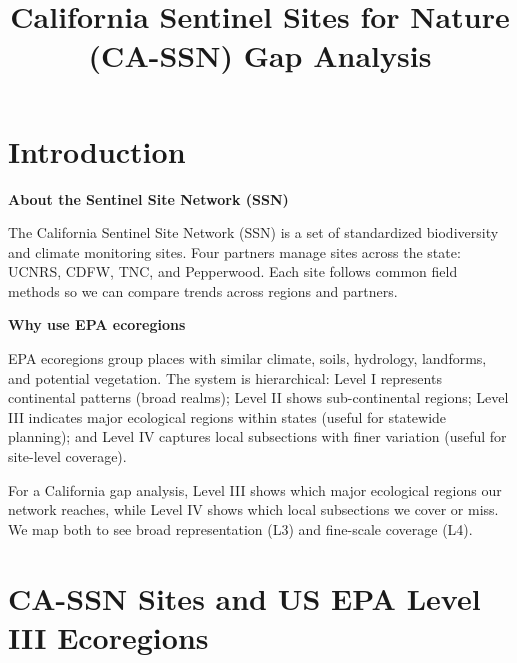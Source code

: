 \documentclass[
  letterpaper,
  DIV=11,
  numbers=noendperiod]{scrartcl}
\title{California Sentinel Sites for Nature (CA-SSN) Gap Analysis}
\author{}
\date{}
\begin{document}
\maketitle


\section{Introduction}\label{introduction}

\textbf{About the Sentinel Site Network (SSN)}

The California Sentinel Site Network (SSN) is a set of standardized
biodiversity and climate monitoring sites. Four partners manage sites
across the state: UCNRS, CDFW, TNC, and Pepperwood. Each site follows
common field methods so we can compare trends across regions and
partners.

\textbf{Why use EPA ecoregions}

EPA ecoregions group places with similar climate, soils, hydrology,
landforms, and potential vegetation. The system is hierarchical: Level I
represents continental patterns (broad realms); Level II shows
sub-continental regions; Level III indicates major ecological regions
within states (useful for statewide planning); and Level IV captures
local subsections with finer variation (useful for site-level coverage).

For a California gap analysis, Level III shows which major ecological
regions our network reaches, while Level IV shows which local
subsections we cover or miss. We map both to see broad representation
(L3) and fine-scale coverage (L4).

\section{CA-SSN Sites and US EPA Level III
Ecoregions}\label{ca-ssn-sites-and-us-epa-level-iii-ecoregions}
\end{document}
